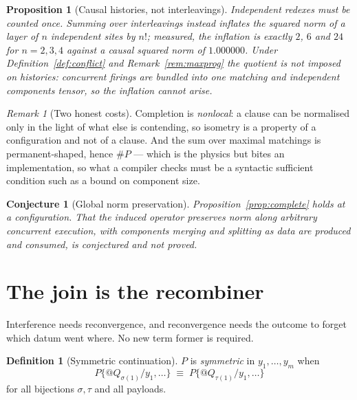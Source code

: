 \documentclass[11pt,a4paper]{article}
\theoremstyle{plain}
\newtheorem{proposition}[theorem]{Proposition}
\newtheorem{conjecture}[theorem]{Conjecture}
\theoremstyle{definition}
\newtheorem{definition}[theorem]{Definition}
\theoremstyle{remark}
\newtheorem{remark}[theorem]{Remark}
\newcommand{\scong}{\equiv}
\begin{document}
\begin{proposition}[Causal histories, not interleavings]\label{prop:causal}
Independent redexes must be counted once. Summing over interleavings instead
inflates the squared norm of a layer of $n$ independent sites by $n!$; measured,
the inflation is exactly $2$, $6$ and $24$ for $n = 2,3,4$ against a causal
squared norm of $1.000000$. Under Definition~\ref{def:conflict} and
Remark~\ref{rem:maxprog} the quotient is not imposed on histories: concurrent
firings are bundled into one matching and independent components tensor, so the
inflation cannot arise.
\end{proposition}

\begin{remark}[Two honest costs]\label{rem:costs}
Completion is \emph{nonlocal}: a clause can be normalised only in the light of
what else is contending, so isometry is a property of a configuration and not of
a clause. And the sum over maximal matchings is permanent-shaped, hence $\#P$
--- which is the physics \cite{AaronsonArkhipov} but bites an implementation, so
what a compiler checks must be a syntactic sufficient condition such as a bound
on component size.
\end{remark}

\begin{conjecture}[Global norm preservation]\label{conj:global}
Proposition~\ref{prop:complete} holds at a configuration. That the induced
operator preserves norm along arbitrary concurrent execution, with components
merging and splitting as data are produced and consumed, is conjectured and not
proved.
\end{conjecture}

\section{The join is the recombiner}\label{sec:erasure}

Interference needs reconvergence, and reconvergence needs the outcome to forget
which datum went where. No new term former is required.

\begin{definition}[Symmetric continuation]\label{def:sym}
$P$ is \emph{symmetric} in $y_1,\dots,y_m$ when
\[
  P\{@Q_{\sigma(1)}/y_1,\dots\} \;\scong\; P\{@Q_{\tau(1)}/y_1,\dots\}
\]
for all bijections $\sigma,\tau$ and all payloads.
\end{definition}
\end{document}
